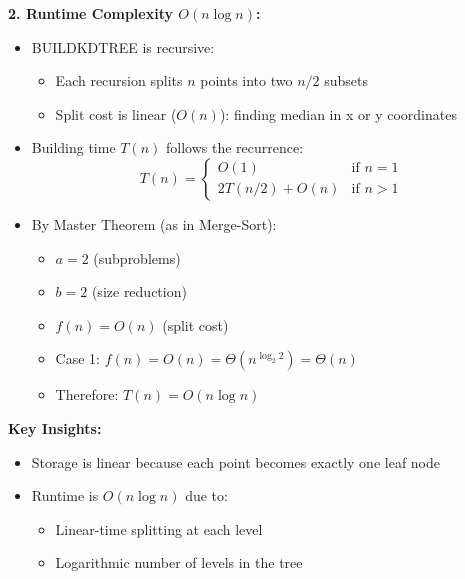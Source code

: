 \textbf{2. Runtime Complexity $O(n \log n)$:}
\begin{itemize}[noitemsep]
    \item BUILDKDTREE is recursive:
        \begin{itemize}[noitemsep]
            \item Each recursion splits $n$ points into two $n/2$ subsets
            \item Split cost is linear ($O(n)$): finding median in x or y coordinates
        \end{itemize}
    \item Building time $T(n)$ follows the recurrence:
        \[ T(n) = \begin{cases}
            O(1) & \text{if } n = 1 \\
            2T(n/2) + O(n) & \text{if } n > 1
        \end{cases} \]
    \item By Master Theorem (as in Merge-Sort):
        \begin{itemize}[noitemsep]
            \item $a = 2$ (subproblems)
            \item $b = 2$ (size reduction)
            \item $f(n) = O(n)$ (split cost)
            \item Case 1: $f(n) = O(n) = \Theta(n^{\log_2 2}) = \Theta(n)$
            \item Therefore: $T(n) = O(n \log n)$
        \end{itemize}
\end{itemize}

\textbf{Key Insights:}
\begin{itemize}[noitemsep]
    \item Storage is linear because each point becomes exactly one leaf node
    \item Runtime is $O(n \log n)$ due to:
        \begin{itemize}[noitemsep]
            \item Linear-time splitting at each level
            \item Logarithmic number of levels in the tree
        \end{itemize}
\end{itemize}
